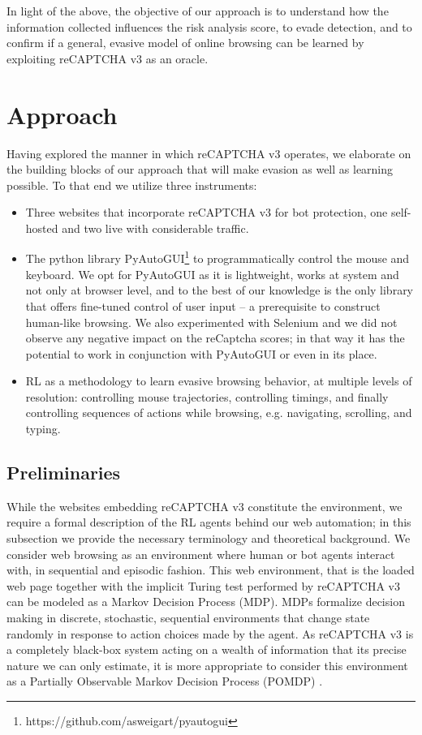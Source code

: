 In light of the above, the objective of our approach is to understand how the information collected influences the risk analysis score, to evade detection, and to confirm if a general, evasive model of online browsing can be learned by exploiting reCAPTCHA v3 as an oracle.

\section{Approach}
\label{sec:approachre}

Having explored the manner in which reCAPTCHA v3 operates, we elaborate on the building blocks of our approach that will make evasion as well as learning possible.
To that end we utilize three instruments:
\begin{itemize}
  \item Three websites that incorporate reCAPTCHA v3 for bot protection, one self-hosted and two live with considerable traffic.
  \item The python library PyAutoGUI\footnote{https://github.com/asweigart/pyautogui} to programmatically control the mouse and keyboard.
  We opt for PyAutoGUI as it is lightweight, works at system and not only at browser level, and to the best of our knowledge is the only library that offers fine-tuned control of user input -- a prerequisite to construct human-like browsing.
  We also experimented with Selenium and we did not observe any negative impact on the reCaptcha scores; in that way it has the potential to work in conjunction with PyAutoGUI or even in its place.
  \item \gls{RL} as a methodology to learn evasive browsing behavior, at multiple levels of resolution: controlling mouse trajectories, controlling timings, and finally controlling sequences of actions while browsing, e.g. navigating, scrolling, and typing.
\end{itemize}

\subsection{Preliminaries}

While the websites embedding reCAPTCHA v3 constitute the environment, we require a formal description of the \gls{RL} agents behind our web automation; in this subsection we provide the necessary terminology and theoretical background.
We consider web browsing as an environment where human or bot agents interact with, in sequential and episodic fashion.
This web environment, that is the loaded web page together with the implicit Turing test performed by reCAPTCHA v3 can be modeled as a Markov Decision Process (MDP).
MDPs formalize decision making in discrete, stochastic, sequential environments that change state randomly in response to action choices made by the agent.
As reCAPTCHA v3 is a completely black-box system acting on a wealth of information that its precise nature we can only estimate, it is more appropriate to consider this environment as a Partially Observable Markov Decision Process (POMDP) \cite{kaelbling1998planning}.

